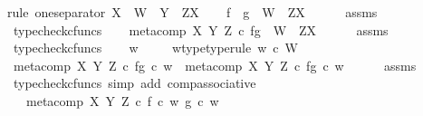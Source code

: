 \begin{isabellebody}
%
\isatagproof
{}\isamarkupfalse%
{\isacharparenleft}{\kern0pt}rule\ one{\isacharunderscore}{\kern0pt}separator{\isacharbrackleft}{\kern0pt}\ X\ {\isacharequal}{\kern0pt}\ W{\isacharcomma}{\kern0pt}\ \ Y\ {\isacharequal}{\kern0pt}\ {\isachardoublequoteopen}Z\isactrlbsup X\isactrlesup {\isachardoublequoteclose}{\isacharbrackright}{\kern0pt}{\isacharparenright}{\kern0pt}\isanewline
\ \ \isamarkupfalse%
\ {\isachardoublequoteopen}f\ {\isasymbox}\ g\ {\isacharcolon}{\kern0pt}\ W\ {\isasymrightarrow}\ Z\isactrlbsup X\isactrlesup {\isachardoublequoteclose}\isanewline
\ \ \ \ \isamarkupfalse%
\ assms\ \isamarkupfalse%
\ typecheck{\isacharunderscore}{\kern0pt}cfuncs\isanewline
\ \ \isamarkupfalse%
\ {\isachardoublequoteopen}meta{\isacharunderscore}{\kern0pt}comp\ X\ Y\ Z\ {\isasymcirc}\isactrlsub c\ {\isasymlangle}f{\isacharcomma}{\kern0pt}g{\isasymrangle}\ {\isacharcolon}{\kern0pt}\ W\ {\isasymrightarrow}\ Z\isactrlbsup X\isactrlesup {\isachardoublequoteclose}\isanewline
\ \ \ \ \isamarkupfalse%
\ assms\ \isamarkupfalse%
\ typecheck{\isacharunderscore}{\kern0pt}cfuncs\isanewline
{}\isamarkupfalse%
\isanewline
\ \ \isamarkupfalse%
\ w\ \isanewline
\ \ \isamarkupfalse%
\ w{\isacharunderscore}{\kern0pt}type{\isacharbrackleft}{\kern0pt}type{\isacharunderscore}{\kern0pt}rule{\isacharbrackright}{\kern0pt}{\isacharcolon}{\kern0pt}\ {\isachardoublequoteopen}w\ {\isasymin}\isactrlsub c\ W{\isachardoublequoteclose}\isanewline
\ \ \isamarkupfalse%
\ {\isachardoublequoteopen}{\isacharparenleft}{\kern0pt}meta{\isacharunderscore}{\kern0pt}comp\ X\ Y\ Z\ {\isasymcirc}\isactrlsub c\ {\isasymlangle}f{\isacharcomma}{\kern0pt}g{\isasymrangle}{\isacharparenright}{\kern0pt}\ {\isasymcirc}\isactrlsub c\ w\ {\isacharequal}{\kern0pt}\ meta{\isacharunderscore}{\kern0pt}comp\ X\ Y\ Z\ {\isasymcirc}\isactrlsub c\ {\isasymlangle}f{\isacharcomma}{\kern0pt}g{\isasymrangle}\ {\isasymcirc}\isactrlsub c\ w{\isachardoublequoteclose}\isanewline
\ \ \ \ \isamarkupfalse%
\ assms\ \isamarkupfalse%
\ {\isacharparenleft}{\kern0pt}typecheck{\isacharunderscore}{\kern0pt}cfuncs{\isacharcomma}{\kern0pt}\ simp\ add{\isacharcolon}{\kern0pt}\ comp{\isacharunderscore}{\kern0pt}associative{}{\isacharparenright}{\kern0pt}\isanewline
\ \ \isamarkupfalse%
\ \isamarkupfalse%
\ {\isachardoublequoteopen}{\isachardot}{\kern0pt}{\isachardot}{\kern0pt}{\isachardot}{\kern0pt}\ {\isacharequal}{\kern0pt}\ meta{\isacharunderscore}{\kern0pt}comp\ X\ Y\ Z\ {\isasymcirc}\isactrlsub c\ {\isasymlangle}f\ {\isasymcirc}\isactrlsub c\ w{\isacharcomma}{\kern0pt}\ g\ {\isasymcirc}\isactrlsub c\ w{\isasymrangle}{\isachardoublequoteclose}\isanewline

\end{isabellebody}
